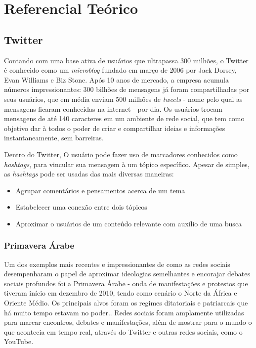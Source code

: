 \chapter{Referencial Teórico}\label{cap:referencial_teorico}

\section{Twitter}\label{sec:twitter}

Contando com uma base ativa de usuários que ultrapassa 300 milhões\cite{twittercompany2016}, o Twitter é conhecido como um \emph{microblog} fundado em março de 2006 por Jack Dorsey, Evan Williams e Biz Stone. Após 10 anos de mercado, a empresa acumula números impressionantes: 300 bilhões de mensagens já foram compartilhadas por seus usuários, que em média enviam 500 milhões de \emph{tweets}\cite{twitterstats2016} - nome pelo qual as mensagens ficaram conhecidas na internet - por dia. Os usuários trocam mensagens de até 140 caracteres\cite{twittercharlimit2016} em um ambiente de rede social, que tem como objetivo dar à todos o poder de criar e compartilhar ideias e informações instantaneamente, sem barreiras\cite{twittercompany2016}. 

Dentro do Twitter, O usuário pode fazer uso de marcadores conhecidos como \emph{hashtags}\cite{waite2012paperback}, para vincular sua mensagem à um tópico específico. Apesar de simples, as \emph{hashtags} pode ser usadas das mais diversas maneiras:
\begin{itemize}
\item Agrupar comentários e pensamentos acerca de um tema
\item Estabelecer uma conexão entre dois tópicos
\item Aproximar o usuários de um conteúdo relevante com auxílio de uma busca
\end{itemize}

\subsection{Primavera Árabe}
Um dos exemplos mais recentes e impressionantes de como as redes sociais desempenharam o papel de aproximar ideologias semelhantes e encorajar debates sociais profundos foi a Primavera Árabe - onda de manifestações e protestos que tiveram início em dezembro de 2010, tendo como cenário o Norte da África e Oriente Médio. Os principais alvos foram os regimes ditatoriais e patriarcais que há muito tempo estavam no poder.\cite{howard2011opening}. Redes sociais foram amplamente utilizadas para marcar encontros, debates e manifestações, além de mostrar para o mundo o que acontecia em tempo real, através do Twitter e outras redes sociais, como o YouTube.

